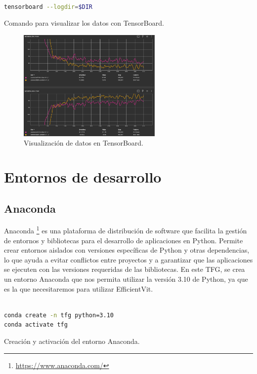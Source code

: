 \begin{code}[h]
\begin{lstlisting}[language=bash]

tensorboard --logdir=$DIR

\end{lstlisting}
\caption[Comando para visualizar los datos en TensorBoard]{Comando para visualizar los datos con TensorBoard.}
\label{cod:cmdtsb}
\end{code}

\begin{figure}[ht]
  \begin{center}
    \includegraphics[width=7cm]{figs/Plataformas_Desarollo/TensorBoard.png}
  \end{center}
  \caption{Visualización de datos en TensorBoard.}
  \label{tensorboard}
\end{figure}

\section{Entornos de desarrollo}
\label{sec:des}

\subsection{Anaconda}
\label{sec:conda}

Anaconda \footnote{\url{https://www.anaconda.com/}} es una plataforma de distribución de software que facilita la gestión de entornos y bibliotecas para el desarrollo de aplicaciones en Python. Permite crear entornos aislados con versiones específicas de Python y otras dependencias, lo que ayuda a evitar conflictos entre proyectos y a garantizar que las aplicaciones se ejecuten con las versiones requeridas de las bibliotecas. En este \ac{TFG}, se crea un entorno Anaconda que nos permita utilizar la versión 3.10 de Python, ya que es la que necesitaremos para utilizar EfficientVit.

\begin{code}[h]
\begin{lstlisting}[language=bash]

conda create -n tfg python=3.10
conda activate tfg

\end{lstlisting}
\caption[Creación del entorno Anaconda]{Creación y activación del entorno Anaconda.}
\label{cod:anaconda}
\end{code}

